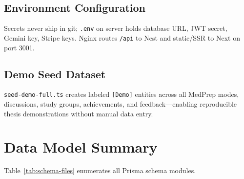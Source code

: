\subsection{Environment Configuration}
Secrets never ship in git; \texttt{.env} on server holds database URL, JWT secret, Gemini key, Stripe keys. Nginx routes \texttt{/api} to Nest and static/SSR to Next on port 3001.

\subsection{Demo Seed Dataset}
\texttt{seed-demo-full.ts} creates labeled \texttt{[Demo]} entities across all MedPrep modes, discussions, study groups, achievements, and feedback---enabling reproducible thesis demonstrations without manual data entry.

\section{Data Model Summary}
Table~\ref{tab:schema-files} enumerates all Prisma schema modules.

